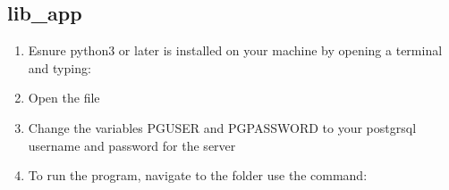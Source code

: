 \documentclass[a4 paper]{article}
\begin{document}
\subsection{lib\_app}
\begin{enumerate}
\item Esnure python3 or later is installed on your machine by opening a terminal and typing: 
\item Open the file 
\item Change the variables PGUSER and PGPASSWORD to your postgrsql username and password for the server
\item To run the program, navigate to the  folder use the command: 
\end{enumerate}
\end{document}
